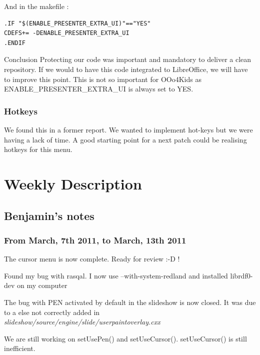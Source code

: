\documentclass[a4paper,11pt]{article}
\begin{document}
And in the makefile :

\begin{verbatim}
.IF "$(ENABLE_PRESENTER_EXTRA_UI)"=="YES"
CDEFS+= -DENABLE_PRESENTER_EXTRA_UI
.ENDIF
\end{verbatim}

Conclusion Protecting our code was important and mandatory to deliver a clean
repository. If we would to have this code integrated to LibreOffice, we will
have to improve this point. This is not so important for OOo4Kids as
ENABLE\_PRESENTER\_EXTRA\_UI is always set to YES.

\subsubsection*{Hotkeys}

We found this in a former report. We wanted to implement hot-keys but we were
having a lack of time. A good starting point for a next patch could be
realising hotkeys for this menu.

\newpage
{}
\fancyfoot[C]{\thepage}
\section*{Weekly Description}

\subsection*{Benjamin's notes}

\subsubsection*{From March, 7th 2011, to March, 13th 2011}

The cursor menu is now complete. Ready for review :-D !

Found my bug with rasqal. I now use --with-system-redland and installed
librdf0-dev on my computer

The bug with PEN activated by default in the slideshow is now closed. It was
due to a else{} not correctly added in
\emph{slideshow/source/engine/slide/userpaintoverlay.cxx}

We are still working on setUsePen() and setUseCursor(). setUseCursor() is
still inefficient.
\end{document}
